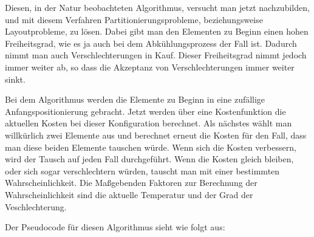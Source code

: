 Diesen, in der Natur beobachteten Algorithmus, versucht man jetzt nachzubilden,
und mit diesem Verfahren Partitionierungsprobleme, beziehungsweise
Layoutprobleme, zu lösen. Dabei gibt man den Elementen zu Beginn einen hohen
Freiheitsgrad, wie es ja auch bei dem Abkühlungsprozess der Fall ist. Dadurch
nimmt man auch Verschlechterungen in Kauf. Dieser Freiheitsgrad nimmt jedoch
immer weiter ab, so dass die Akzeptanz von Verschlechterungen immer weiter
sinkt.\vspace{10pt}

Bei dem Algorithmus werden die Elemente zu Beginn in eine zufällige
Anfangspositionierung gebracht. Jetzt werden über eine Kostenfunktion die
aktuellen Kosten bei dieser Konfiguration berechnet. Als nächstes wählt man
willkürlich zwei Elemente aus und berechnet erneut die Kosten für den Fall,
dass man diese beiden Elemente tauschen würde. Wenn sich die Kosten verbessern,
wird der Tausch auf jeden Fall durchgeführt. Wenn die Kosten gleich bleiben,
oder sich sogar verschlechtern würden, tauscht man mit einer bestimmten
Wahr\-schein\-lich\-keit. Die Maßgebenden Faktoren zur Berechnung der
Wahr\-schein\-lich\-keit sind die aktuelle Temperatur und der Grad der
Veschlechterung.\vspace{10pt}

\noindent
Der Pseudocode für diesen Algorithmus sieht wie folgt aus:\vspace{10pt}

